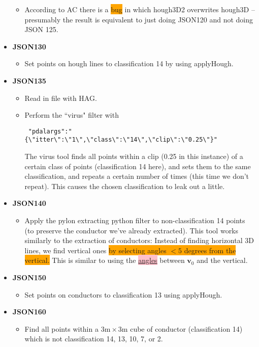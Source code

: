 \documentclass[a4paper,11pt,twoside]{article}
\theoremstyle{definition}
\theoremstyle{remark}
\newcommand{\sh}[1]{\colorbox{pink}{#1}}
\newcommand{\bad}[1]{\colorbox{orange}{#1}}
\begin{document}
\begin{itemize}
\begin{itemize}
\item According to AC there is a \bad{bug} in which hough3D2 overwrites hough3D -- presumably the result is equivalent to just doing JSON120 and not doing JSON 125.
\end{itemize}
\item \textbf{JSON130}
\begin{itemize}
\item Set points on hough lines to classification 14 by using applyHough.
\end{itemize}
\item \textbf{JSON135}
\begin{itemize}
\item Read in file with HAG.
\item Perform the ``virus" filter with 
\begin{center}
\begin{verbatim}
 "pdalargs":"{\"itter\":\"1\",\"class\":\"14\",\"clip\":\"0.25\"}"
\end{verbatim}
\end{center}
The virus tool finds all points within a clip (0.25 in this instance) of a certain class of points (classification 14 here), and sets them to the same classification, and repeats a certain number of times (this time we don't repeat). This causes the chosen classification to leak out a little.
\end{itemize}
\item \textbf{JSON140}
\begin{itemize}
\item Apply the pylon extracting python filter to non-classification 14 points (to preserve the conductor we've already extracted). This tool works similarly to the extraction of conductors: Instead of finding horizontal 3D lines, we find vertical ones \bad{by selecting angles $<5$ degrees from the vertical.} This is similar to using the \hyperref[roc]{\sh{angles}} between $\textbf{v}_0$ and the vertical.
\end{itemize}
\item \textbf{JSON150}
\begin{itemize}
\item Set points on conductors to classification 13 using applyHough.
\end{itemize}
\item \textbf{JSON160}
\begin{itemize}
\item Find all points within a $3\mathrm{m}\times 3\mathrm{m}$ cube of conductor (classification 14) which is not classification 14, 13, 10, 7, or 2. 

\end{itemize}
\end{itemize}
\end{document}
